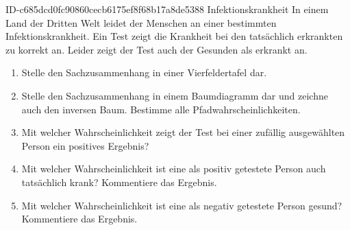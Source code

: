 \begin{exercise}
      {ID-c685dcd0fc90860cecb6175ef8f68b17a8de5388}
      {Infektionskrankheit}
  \ifproblem\problem
    In einem Land der Dritten Welt leidet  der Menschen an einer
    bestimmten Infektionskrankheit. Ein Test zeigt die Krankheit bei den
    tatsächlich erkrankten zu  korrekt an. Leider zeigt der Test
    auch  der Gesunden als erkrankt an.
    \begin{enumerate}
      \item Stelle den Sachzusammenhang in einer Vierfeldertafel dar.
      \item Stelle den Sachzusammenhang in einem Baumdiagramm dar und zeichne
            auch den inversen Baum. Bestimme alle Pfadwahrscheinlichkeiten.
      \item Mit welcher Wahrscheinlichkeit zeigt der Test bei einer zufällig
            ausgewählten Person ein positives Ergebnis?
      \item Mit welcher Wahrscheinlichkeit ist eine als positiv getestete
            Person auch tatsächlich krank? Kommentiere das Ergebnis.
      \item Mit welcher Wahrscheinlichkeit ist eine als negativ getestete
            Person gesund? Kommentiere das Ergebnis.
    \end{enumerate}
  \fi
\end{exercise}

